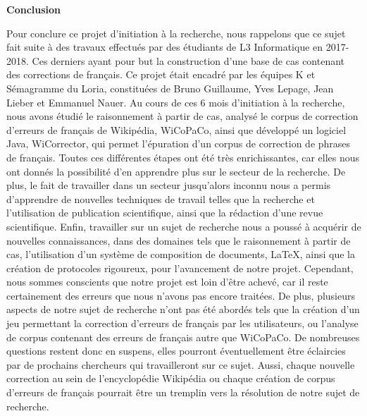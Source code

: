 \documentclass[11pt]{article}
\begin{document}
\cleardoublepage
\begin{center}
{\bfseries \huge Conclusion}
\end{center}
\vspace*{35mm}
Pour conclure ce projet d'initiation \`{a} la recherche, nous rappelons que ce sujet fait suite \`{a} des travaux effectu\'{e}s par des \'{e}tudiants de L3 Informatique en 2017-2018. Ces derniers ayant pour but la construction d'une base de cas contenant des corrections de fran\c{c}ais. Ce projet \'{e}tait encadr\'{e} par les \'{e}quipes K et S\'{e}magramme du Loria, constitu\'{e}es de Bruno Guillaume, Yves Lepage, Jean Lieber et Emmanuel Nauer.
\newline
\newline
	Au cours de ces 6 mois d'initiation \`{a} la recherche, nous avons \'{e}tudi\'{e} le raisonnement \`{a} partir de cas, analys\'{e} le corpus de correction d'erreurs de fran\c{c}ais de Wikip\'{e}dia, WiCoPaCo, ainsi que d\'{e}velopp\'{e} un logiciel Java, WiCorrector, qui permet l'\'{e}puration d'un corpus de correction de phrases de fran\c{c}ais. Toutes ces diff\'{e}rentes \'{e}tapes ont \'{e}t\'{e} tr\`{e}s enrichissantes, car elles nous ont donn\'{e}s la possibilit\'{e} d'en apprendre plus sur le secteur de la recherche. De plus, le fait de travailler dans un secteur jusqu'alors inconnu nous a permis d'apprendre de nouvelles techniques de travail telles que la recherche et l'utilisation de publication scientifique, ainsi que la r\'{e}daction d'une revue scientifique. Enfin, travailler sur un sujet de recherche nous a pouss\'{e} \`{a} acqu\'{e}rir de nouvelles connaissances, dans des domaines tels que le raisonnement \`{a} partir de cas, l'utilisation d'un syst\`{e}me de composition de documents, LaTeX, ainsi que la cr\'{e}ation de protocoles rigoureux, pour l'avancement de notre projet.
\newline
\newline
	Cependant, nous sommes conscients que notre projet est loin d'\^{e}tre achev\'{e}, car il reste certainement des erreurs que nous n'avons pas encore trait\'{e}es. De plus, plusieurs aspects de notre sujet de recherche n'ont pas \'{e}t\'{e} abord\'{e}s tels que la cr\'{e}ation d'un jeu permettant la correction d'erreurs de fran\c{c}ais par les utilisateurs, ou l'analyse de corpus contenant des erreurs de fran\c{c}ais autre que WiCoPaCo. De nombreuses questions restent donc en suspens, elles pourront \'{e}ventuellement \^{e}tre \'{e}claircies par de prochains chercheurs qui travailleront sur ce sujet. Aussi, chaque nouvelle correction au sein de l'encyclop\'{e}die Wikip\'{e}dia ou chaque cr\'{e}ation de corpus d'erreurs de fran\c{c}ais pourrait \^{e}tre un tremplin vers la r\'{e}solution de notre sujet de recherche.
\end{document}

